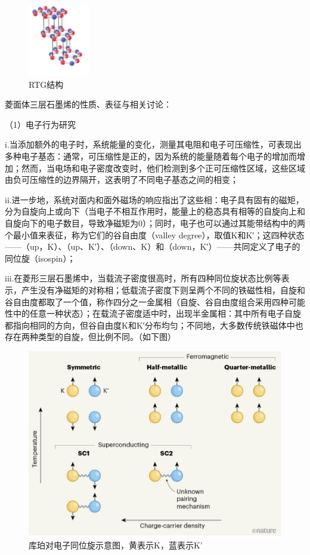 \begin{figure}
    \centering
    \includegraphics[scale=1.5]{img/3.png}
    \caption{RTG结构}
\end{figure}

菱面体三层石墨烯的性质、表征与相关讨论：

（1）电子行为研究

i.当添加额外的电子时，系统能量的变化，测量其电阻和电子可压缩性，可表现出多种电子基态：通常，可压缩性是正的，因为系统的能量随着每个电子的增加而增加；然而，当电场和电子密度改变时，他们检测到多个正可压缩性区域，这些区域由负可压缩性的边界隔开，这表明了不同电子基态之间的相变；

ii.进一步地，系统对面内和面外磁场的响应指出了这些相：电子具有固有的磁矩，分为自旋向上或向下（当电子不相互作用时，能量上的稳态具有相等的自旋向上和自旋向下的电子数目，导致净磁矩为0）；同时，电子也可以通过其能带结构中的两个最小值来表征，称为它们的谷自由度（valley degree），取值K和K′；这四种状态——（up，K）、（up、K′）、（down、K）和（down，K′）——共同定义了电子的同位旋（isospin）；

iii.在菱形三层石墨烯中，当载流子密度很高时，所有四种同位旋状态比例等表示，产生没有净磁矩的对称相；低载流子密度下则呈两个不同的铁磁性相，自旋和谷自由度都取了一个值，称作四分之一金属相（自旋、谷自由度组合采用四种可能性中的任意一种状态）；在载流子密度适中时，出现半金属相：其中所有电子自旋都指向相同的方向，但谷自由度K和K′分布均匀；不同地，大多数传统铁磁体中也存在两种类型的自旋，但比例不同。（如下图）

\begin{figure}
    \centering
    \includegraphics[scale=0.6]{img/4.png}
    \caption{库珀对电子同位旋示意图，黄表示K，蓝表示K’}
\end{figure}

